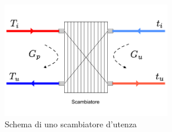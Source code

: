 \documentclass[laurea,oneside,11pt]{USiena_tesiLM3}
\begin{document}
\begin{figure}[h]
\begin{center}
\includegraphics[width=0.65\textwidth]{figure/scambiatore} %
\caption{Schema di uno scambiatore d'utenza}
\label{fig:scamb}
\end{center}
\end{figure}
\end{document}
